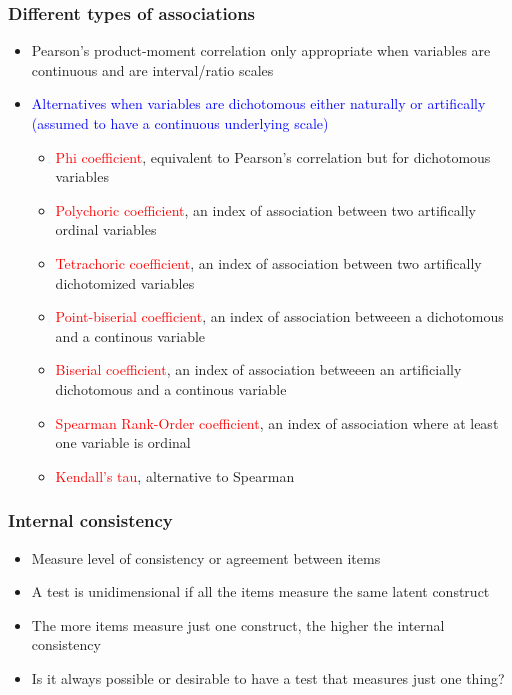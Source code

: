 \documentclass[dvipsnames]{beamer}\usepackage[]{graphicx}\usepackage[]{color}
\begin{document}
\begin{frame}
\frametitle{Different types of associations}
\begin{itemize}
  \item Pearson's product-moment correlation only appropriate when variables are continuous and are interval/ratio scales
  \item \textcolor{blue}{Alternatives when variables are dichotomous either naturally or artifically (assumed to have a continuous underlying scale)}
  \begin{itemize}
    \item \textcolor{red}{Phi coefficient}, equivalent to Pearson's correlation but for dichotomous variables
    \item \textcolor{red}{Polychoric coefficient}, an index of association between two artifically ordinal variables
    \item \textcolor{red}{Tetrachoric coefficient}, an index of association between two artifically dichotomized variables
    \item \textcolor{red}{Point-biserial coefficient}, an index of association betweeen a dichotomous and a continous variable
    \item \textcolor{red}{Biserial coefficient}, an index of association betweeen an artificially dichotomous and a continous variable
    \item \textcolor{red}{Spearman Rank-Order coefficient}, an index of association where at least one variable is ordinal
    \item \textcolor{red}{Kendall's tau}, alternative to Spearman
  \end{itemize}
\end{itemize}
\end{frame}

\begin{frame}
\frametitle{Internal consistency}
  \begin{itemize}
    \item<1-> Measure level of consistency or agreement between items
    \item<2-> A test is unidimensional if all the items measure the same latent construct
    \item<3-> The more items measure just one construct, the higher the internal consistency
    \item<4-> Is it always possible or desirable to have a test that measures just one thing?
  \end{itemize}
\end{frame}
\end{document}
